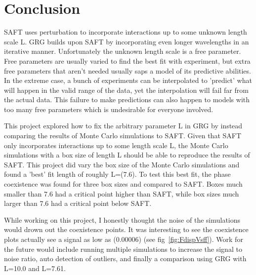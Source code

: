 \section{Conclusion}
SAFT uses perturbation to incorporate interactions up to some unknown length scale L. GRG builds upon SAFT by incorporating even longer wavelengths in an iterative manner. Unfortunately the unknown length scale is a free parameter. Free parameters are usually varied to find the best fit with experiment, but extra free parameters that aren't needed usually saps a model of its predictive abilities. In the extreme case, a bunch of experiments can be interpolated to 'predict' what will happen in the valid range of the data, yet the interpolation will fail far from the actual data. This failure to make predictions can also happen to models with too many free parameters which is undesirable for everyone involved.

This project explored how to fix the arbitrary parameter L in GRG by instead comparing the results of Monte Carlo simulations to SAFT. Given that SAFT only incorporates interactions up to some length scale L, the Monte Carlo simulations with a box size of length L should be able to reproduce the results of SAFT. This project did vary the box size of the Monte Carlo simulations and found a 'best' fit length of roughly L=(7.6). To test this best fit, the phase coexistence was found for three box sizes and compared to SAFT. Boxes much smaller than 7.6 had a critical point higher than SAFT, while box sizes much larger than 7.6 had a critical point below SAFT.

While working on this project, I honestly thought the noise of the simulations would drown out the coexistence points. It was interesting to see the coexistence plots actually see a signal as low as (0.00006) (see fig~\ref{fig:FdispVsff}). Work for the future would include running multiple simulations to increase the signal to noise ratio, auto detection of outliers, and finally a comparison using GRG with L=10.0 and L=7.61.